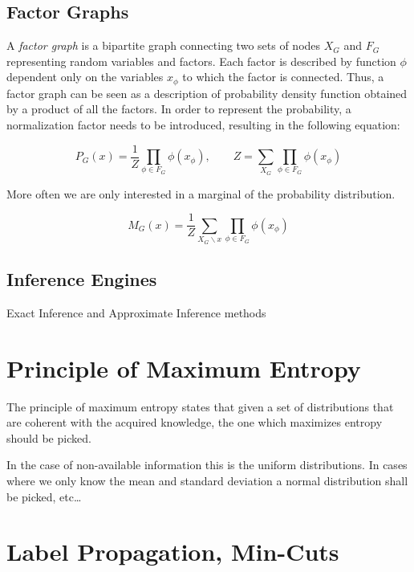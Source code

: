 \subsection{Factor Graphs}
A \emph{factor graph} is a bipartite graph connecting two sets of nodes $X_G$ and $F_G$
representing random variables and factors.
Each factor is described by function $\phi$ dependent only on the variables $x_\phi$
to which the factor is connected.
Thus, a factor graph can be seen as a description of probability density function obtained
by a product of all the factors. In order to represent the probability,
a normalization factor needs to be introduced, resulting in the following equation:

\begin{equation}
P_G(x) = \frac{1}{Z}\prod_{\phi \in F_G}{\phi(x_{\phi})},\qquad
Z = \sum_{X_G}\prod_{\phi \in F_G}{\phi(x_{\phi})}
\end{equation}


More often we are only interested in a marginal of the probability distribution.

\begin{equation}
M_G(x) = \frac{1}{Z}\sum_{X_G \backslash x}{\prod_{\phi \in F_G}{\phi(x_{\phi})}}
\end{equation}

\subsection{Inference Engines}
Exact Inference and Approximate Inference methods

\section{Principle of Maximum Entropy}
\label{sec:max-entropy}
The principle of maximum entropy states that given a set of distributions that
are coherent with the acquired knowledge, the one which maximizes entropy should
be picked.

In the case of non-available information this is the uniform distributions.
In cases where we only know the mean and standard deviation a normal
distribution shall be picked, etc\dots

\section{Label Propagation, Min-Cuts}



